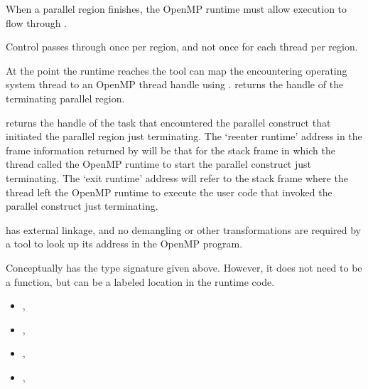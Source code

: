 \descr

When a parallel region finishes, the OpenMP runtime must allow execution
to flow through .

Control passes through 
once per region, and not once for each thread per region.

At the point the runtime reaches 
the tool can map the encountering operating system thread
to an OpenMP thread handle using .
returns the handle of the terminating parallel region.

returns the handle of the task that encountered the
parallel construct that initiated the parallel region just
terminating.
The `reenter runtime' address in the frame information returned by
will be that for the stack frame in which the thread called the
OpenMP runtime to start the parallel construct just terminating.
The `exit runtime' address will refer to the stack frame where the
thread left the OpenMP runtime to execute the user code that
invoked the parallel construct just terminating.

\restrictions

 has external  linkage, and no
demangling or other transformations are required by a tool
to look up its address in the OpenMP program.

Conceptually  has the type signature
given above.
However, it does not need to be a function, but can be a labeled location
in the runtime code.

\crossreferences
\begin{itemize}
\item
  , 
\item
  , 
\item
  , 
\item
  , 
\end{itemize}


\label{sec:ompd:ompd_bp_task_begin}

